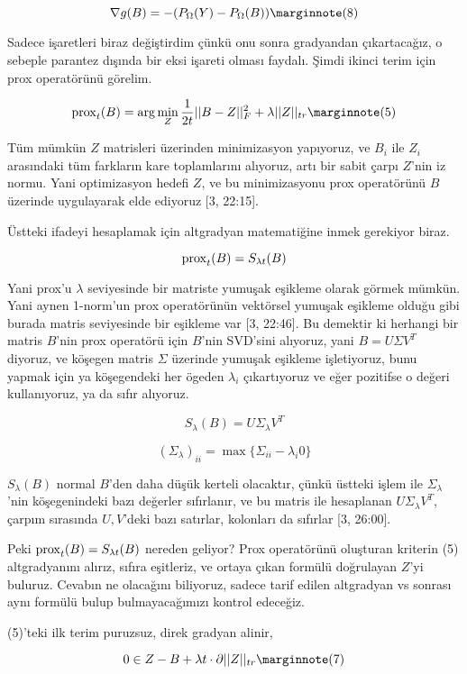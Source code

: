 \documentclass[12pt,fleqn]{article}\usepackage{../../common}
\begin{document}
$$
\nabla g(B) = -(  P_\Omega (Y) - P_\Omega(B) ) 
\mlabel{8}
$$

Sadece işaretleri biraz değiştirdim çünkü onu sonra gradyandan
çıkartacağız, o sebeple parantez dışında bir eksi işareti olması
faydalı. Şimdi ikinci terim için prox operatörünü görelim. 

$$
\prox_t(B) = \arg\min_Z \frac{1}{2t} || B - Z ||_F^2 + \lambda ||Z||_{tr}
\mlabel{5}
$$

Tüm mümkün $Z$ matrisleri üzerinden minimizasyon yapıyoruz, ve $B_i$ ile
$Z_i$ arasındaki tüm farkların kare toplamlarını alıyoruz, artı bir sabit
çarpı $Z$'nin iz normu. Yani optimizasyon hedefi $Z$, ve bu minimizasyonu
prox operatörünü $B$ üzerinde uygulayarak elde ediyoruz [3, 22:15]. 

Üstteki ifadeyi hesaplamak için altgradyan matematiğine inmek gerekiyor
biraz. 

$$
\operatorname{prox}_t(B) = S_{\lambda t} (B)
$$

Yani prox'u $\lambda$ seviyesinde bir matriste yumuşak eşikleme olarak
görmek mümkün. Yani aynen 1-norm'un prox operatörünün vektörsel yumuşak
eşikleme olduğu gibi burada matris seviyesinde bir eşikleme var [3, 22:46].
Bu demektir ki herhangi bir matris $B$'nin prox operatörü için $B$'nin
SVD'sini alıyoruz, yani $B = U\Sigma V^T$ diyoruz, ve köşegen matris
$\Sigma$ üzerinde yumuşak eşikleme işletiyoruz, bunu yapmak için ya
köşegendeki her ögeden $\lambda_i$ çıkartıyoruz ve eğer pozitifse o değeri
kullanıyoruz, ya da sıfır alıyoruz. 

$$
S_\lambda (B) = U \Sigma_\lambda V^T
$$
 
$$
(\Sigma_\lambda)_{ii}  = \max \{ \Sigma_{ii} - \lambda_i 0 \}
$$

$S_\lambda (B)$ normal $B$'den daha düşük kerteli olacaktır, çünkü üstteki
işlem ile $\Sigma_\lambda$'nin köşegenindeki bazı değerler sıfırlanır, ve
bu matris ile hesaplanan $U \Sigma_\lambda V^T$, çarpım sırasında
$U,V$'deki bazı satırlar, kolonları da sıfırlar [3, 26:00].

Peki $\operatorname{prox}_t(B) = S_{\lambda t} (B)$ nereden geliyor? Prox operatörünü
oluşturan kriterin (5) altgradyanını alırız, sıfıra eşitleriz, ve ortaya
çıkan formülü doğrulayan $Z$'yi buluruz. Cevabın ne olacağını biliyoruz,
sadece tarif edilen altgradyan vs sonrası aynı formülü bulup
bulmayacağımızı kontrol edeceğiz. 

(5)'teki ilk terim puruzsuz, direk gradyan alinir, 

$$
0 \in Z - B + \lambda t \cdot \partial ||Z||_{tr} 
\mlabel{7}
$$
\end{document}
